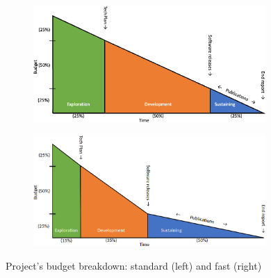 \begin{figure}[t!]
    \centering
    \begin{subfigure}[b]{0.49\textwidth}
        \centering
        \includegraphics[width=0.97\textwidth]{img/budget-stages.png}
        \vspace{0.2cm}
    \end{subfigure}%
    \hfill
    \begin{subfigure}[b]{0.49\textwidth}
        \centering
        \includegraphics[width=0.97\textwidth]{img/budget-faster.png}
        \vspace{0.2cm}
    \end{subfigure}
    \caption{Project's budget breakdown: standard (left) and fast (right)}
    \label{fig:project-budget}
\end{figure}

